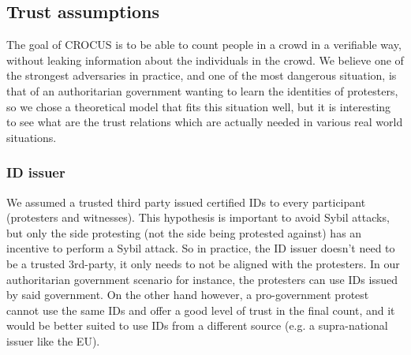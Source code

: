 



\subsection{Trust assumptions}

The goal of CROCUS is to be able to count people in a crowd in a verifiable way, without leaking information about the individuals in the crowd.
We believe one of the strongest adversaries in practice, and one of the most dangerous situation, is that of an authoritarian government wanting to learn the identities of protesters,
so we chose a theoretical model that fits this situation well, but it is interesting to see what are the trust relations which are actually needed in various real world situations.

\subsubsection{ID issuer} We assumed a trusted third party issued certified IDs to every participant (protesters and witnesses). This hypothesis is important to avoid Sybil attacks,
but only the side protesting (not the side being protested against) has an incentive to perform a Sybil attack.
So in practice, the ID issuer doesn't need to be a trusted 3rd-party, it only needs to not be aligned with the protesters.
In our authoritarian government scenario for instance, the protesters can use IDs issued by said government.
On the other hand however, a pro-government protest cannot use the same IDs and offer a good level of trust in the final count, and it would be better suited to use IDs from a different source
(e.g. a supra-national issuer like the EU).

